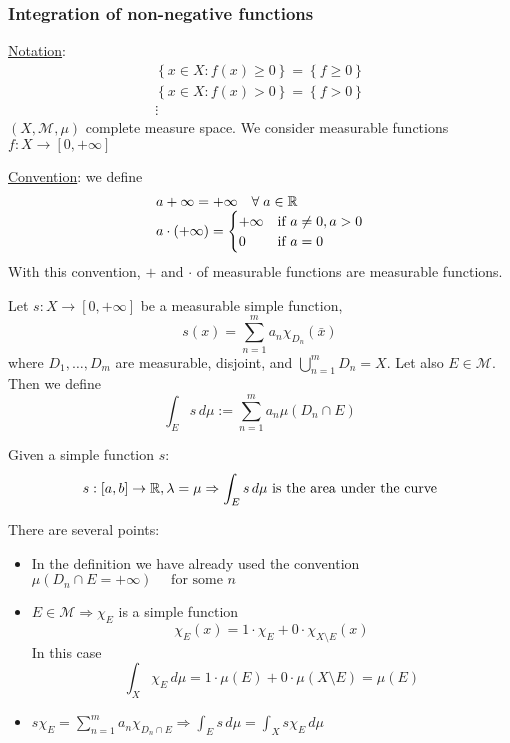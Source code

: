 \subsubsection*{Integration of non-negative functions}
\noindent\underline{Notation}: \[
    \begin{array}{c}
        \left\{ x \in X : f(x) \geq 0 \right\} = \left\{ f \geq 0 \right\} \\
        \left\{ x \in X : f(x) > 0 \right\} = \left\{ f > 0 \right\}   \\
        \vdots
    \end{array}
    \]
\((X, \mathcal{M}, \mu)\) complete measure space.
We consider measurable functions \(f: X \to [0, +\infty]\)

\noindent\underline{Convention}: we define 
\[
    \begin{array}{l}
        a + \infty = +\infty \quad \forall \; a \in \mathbb{R} \\
        a \cdot (+\infty) = \begin{cases}
            +\infty & \mbox{if } a \neq 0, a > 0 \\
            0 & \mbox{if } a = 0
        \end{cases}        
    \end{array}
\]
With this convention, \(+ \) and \( \cdot\) of measurable functions are measurable functions.
\begin{definition}
    Let \(s: X \to [0, +\infty]\) be a measurable simple function, 
    \[
        s(x) = \sum_{n=1}^m a_n \chi_{D_n}(\bar{x})
    \]
    where \(D_1,\ldots,D_m\) are measurable, disjoint, and \(\bigcup_{n=1}^m D_n = X\). Let also \(E \in \mathcal{M}\). Then we define 
    \[
        \int_E s \, d\mu := \sum_{n=1}^m a_n \mu(D_n \cap E)
    \]
\end{definition}
\begin{remark}
    Given a simple function \(s\):
    \[s:[a,b] \to \mathbb{R}, \lambda = \mu \Rightarrow \int_E s \, d\mu \mbox{ is the area under the curve}\]
\end{remark}
\begin{remark}
    There are several points:
    \begin{itemize}
        \item In the definition we have already used the convention \(\mu(D_n \cap E = +\infty) \quad \mbox{ for some }n\)
        \item \(E \in \mathcal{M} \Rightarrow \chi_E\) is a simple function
        \[
            \chi_E(x) = 1 \cdot \chi_E + 0 \cdot \chi_{X\setminus E}(x)
        \] 
        In this case 
        \[
            \int_X \chi_E \, d\mu = 1\cdot \mu(E) + 0 \cdot \mu(X\setminus E) = \mu(E)
        \]
        \item \(s\chi_E = \sum_{n=1}^m a_n\chi_{D_n \cap E} \Rightarrow \int_E s\, d\mu = \int_X s\chi_E \, d\mu\)
    \end{itemize}
\end{remark}
